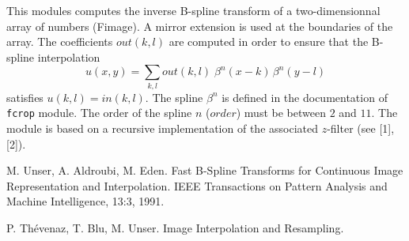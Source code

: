 This modules computes the inverse B-spline transform of a two-dimensionnal
array of numbers (Fimage). A mirror extension is used at the boundaries of
the array.
The coefficients $out(k,l)$ are computed in order to ensure that 
the B-spline interpolation
$$u(x,y) = \sum_{k,l} out(k,l) \;\beta^n(x-k) \, \beta^n(y-l)$$
satisfies $u(k,l)=in(k,l)$.
The spline $\beta^n$ is defined in the documentation of \verb+fcrop+ module.
The order of the spline $n$ ($order$) must be between $2$ and $11$.
The module is based on a recursive implementation of the associated $z$-filter
(see [1],[2]).

\begin{thebibliography}{99}
M. Unser, A. Aldroubi, M. Eden.
\newblock Fast B-Spline Transforms for Continuous Image Representation and Interpolation.
\newblock IEEE Transactions on Pattern Analysis and Machine Intelligence, 13:3, 1991.

P. Th\'evenaz, T. Blu, M. Unser.
\newblock Image Interpolation and Resampling.
\end{thebibliography}
